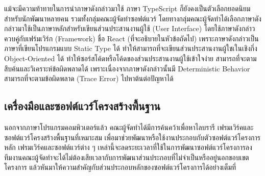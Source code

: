 \documentclass[12pt,one side,openright,a4paper]{cpe-thesis-th}
\newcommand{\thaijustify}[1]{%
  \par\hspace{30pt}\justifying
  #1
}
\begin{document}
            \thaijustify{
                แม้จะมีความท้าทายในการนำภาษาดังกล่าวมาใช้ ภาษา TypeScript ก็ยังคงเป็นตัวเลือกยอดนิยม สำหรับนักพัฒนาหลายคน รวมทั้งกลุ่่มคณะผู้จัดทำซอฟต์แวร์ โดยทางกลุ่มคณะผู้จัดทำได้เลือกภาษาดังกล่าวมาใช้เป็นภาษาหลักสำหรับเขียนส่วนประสานงานผู้ใช้ (User Interface) โดยใช้ภาษาดังกล่าวควบคู่กับเฟร์มเวิร์ก (Framework) ชื่อ React (ที่จะอธิบายในหัวข้อถัดไป) เพราะภาษาดังกล่าวเป็นภาษาที่เขียนโปรแกรมแบบ Static Type ได้ ทำให้สามารถที่จะเขียนส่วนประสานงานผู้ใชเในเชิงกึ่ง Object-Oriented ได้ ทำให้ซอร์สโค้ดหรือโค้ดของส่วนประสานงานผู้ใช้เข้าใจง่าย สามารถที่จะตามสึบค้นและวิเคราะห์ข้อผิดพลาดได้ เพราะเนื่องจากภาษาดังกล่าวนั้นมี Deterministic Behavior สามารถที่จะตามข้อผิดพลาด (Trace Error) ไปหาต้นต่อปัญหาได้
            }
    \subsection{เครื่องมือและซอฟต์แวร์โครงสร้างพื้นฐาน}
        นอกจากภาษาโปรแกรมคอมพิวเตอร์แล้ว คณะผู้จัดทำได้มีการค้นคว้าเพื่อหาไลบรารี เฟรมเวิร์คและซอฟต์แวร์โครงสร้างพื้นฐานที่เหมาะสม เพื่อมาช่วยพัฒนาหรือใช้งานประกอบกับตัวซอฟต์แวร์โครงการหลัก เฟรมเวิร์คและซอฟต์แวร์ต่าง ๆ เหล่านี้จะลดระยะเวลาที่ใช้ในการพัฒนาซอฟต์แวร์โครงการลง ทีมงานคณะผู้จัดทำจะได้ไม่ต้องเสียเวลากับการพัฒนาส่วนประกอบที่ไม่จำเป็นหรืออยู่นอกขอบเขตโครงการ แล้วหันมาให้ความสำคัญกับส่วนประกอบหลักของซอฟต์แวร์โครงการได้อย่างเต็มที่
\end{document}
